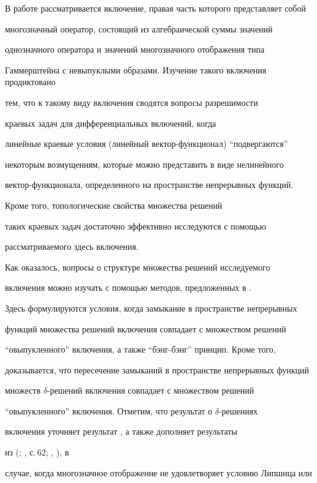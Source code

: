 \label{begin}





В работе рассматривается включение, правая часть которого представляет собой


многозначный оператор, состоящий из алгебраической суммы значений


однозначного оператора и значений многозначного отображения типа


Гаммерштейна с невыпуклыми образами. Изучение такого включения продиктовано


тем, что к такому виду включения сводятся вопросы разрешимости


краевых задач для дифференциальных включений, когда


линейные краевые условия (линейный вектор-функционал) ``подвергаются''


некоторым возмущениям, которые можно представить в виде нелинейного


вектор-функционала, определенного на пространстве непрерывных функций.


Кроме того, топологические свойства множества решений


таких краевых задач достаточно эффективно исследуются с помощью


рассматриваемого здесь включения.





Как оказалось, вопросы о структуре множества решений исследуемого


включения можно изучать с помощью методов, предложенных в \cite{1}.


Здесь формулируются условия, когда замыкание в пространстве непрерывных


функций множества решений включения совпадает с множеством решений


``овыпукленного'' включения, а также ``бэнг-бэнг'' принцип. Кроме того,


доказывается, что пересечение замыканий в пространстве непрерывных функций


множеств $\delta$-решений включения совпадает с множеством решений


``овыпукленного'' включения. Отметим, что результат о $\delta$-решениях


включения уточняет результат \cite{2}, а также дополняет результаты


из (\cite{3}; \cite{4}, с.\,62; \cite{5}, \cite{6}), в


случае, когда многозначное отображение не удовлетворяет условию Липшица или


